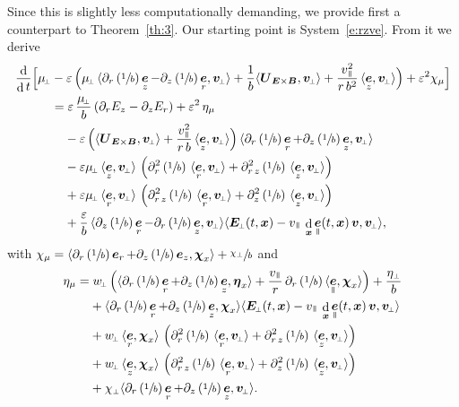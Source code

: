 \documentclass[10pt]{amsart}
\newcommand{\sperp}{{\scriptscriptstyle\perp}}
\let\eps\varepsilon
\let\d\partial
\DeclareMathOperator\dD{d}\let\dd\dD
\theoremstyle{plain}
\theoremstyle{definition}
\newcommand\bB{{\boldsymbol B}}
\newcommand\bE{{\boldsymbol E}}
\newcommand\bU{{\boldsymbol U}}
\newcommand\bfv{{\boldsymbol v}}
\newcommand\bfx{{\boldsymbol x}}
\newcommand\bfeta{{\boldsymbol \eta}}
\newcommand\bfchi{{\boldsymbol \chi}}
\DeclareMathOperator{\beD}{\boldsymbol{e}}
\newcommand\eDr{\beD_r}
\newcommand\eDz{\beD_z}
\newcommand\eDpar{\beD_\mypar}
\newcommand\vpar{v_\mypar}
\newcommand\bvperp{\bfv_{\!\sperp}}
\newcommand\eperp{w_{\!\sperp}}
\newcommand\muperp{\mu_{\!\sperp}}
\newcommand\Eperp{\bE_{\!\sperp}}
\newcommand\Er{E_r}
\newcommand\Ez{E_z}
\newcommand{\EcB}{\bU_{\bE\times\bB}}
\newcommand{\mypar}{{\mkern3mu\vphantom{\perp}\vrule depth 0pt\mkern2mu\vrule depth 0pt\mkern3mu}}
\begin{document}
Since this is slightly less computationally demanding, we provide first a counterpart to Theorem~\ref{th:3}. Our starting point is System~\eqref{e:rzve}. From it we derive
\begin{align*}
\frac{\dD}{\dD t}\Bigl[\muperp&
-\eps\,\Bigl(
\muperp\,\langle
\d_r\left(\sfrac1b\right)\eDz-\d_z\left(\sfrac1b\right)\eDr,\bvperp\rangle +\frac1b\langle\EcB,\bvperp\rangle
+\frac{\vpar^2}{r\,b^2}
\,\langle\eDz,\bvperp\rangle
\Bigr)+\eps^2\chi_\mu\Bigr]\\
&=
\eps\,\frac{\muperp}{b}\left(\d_r\Ez-\d_z\Er\right)
+\eps^2\,\eta_\mu\\
&\hphantom{={}}-\eps\,
\Bigl(\langle\EcB,\bvperp\rangle
+\frac{\vpar^2}{r\,b}
\,\langle\eDz,\bvperp\rangle
\Bigr)
\,\langle
\d_r\left(\sfrac1b\right)\eDr
+\d_z\left(\sfrac1b\right)\eDz
,\bvperp\rangle\\
&\hphantom{={}}
-\eps\muperp\,\langle\eDz,\bvperp\rangle\,\left(
\d_r^2\left(\sfrac1b\right)\,\langle\eDr,\bvperp\rangle
+\d_{r\,z}^2\left(\sfrac1b\right)\,\langle\eDz,\bvperp\rangle
\right)
\\
&\hphantom{={}}
+\eps\muperp\,\langle\eDr,\bvperp\rangle\,
\left(\d_{r\,z}^2\left(\sfrac1b\right)\,\langle\eDr,\bvperp\rangle
+\d_z^2\left(\sfrac1b\right)\,\langle\eDz,\bvperp\rangle
\right)
\\
&\hphantom{={}}
+\frac{\eps}{b}\,
\langle\d_z\left(\sfrac1b\right)\eDr
-\d_r\left(\sfrac1b\right)\eDz,
\bvperp\rangle\langle \Eperp(t,\bfx)-\vpar\,
\dD_{\bfx}\eDpar(t,\bfx)\,\bfv,
\bvperp\rangle,
\end{align*}
with
$\chi_\mu
=
\langle\d_r\left(\sfrac1b\right)\eDr
+\d_z\left(\sfrac1b\right)\eDz,\bfchi_x\rangle
+\sfrac{\chi_\sperp}{b}$
and
\begin{align*}
\eta_\mu&=
\eperp\,\Bigl(\langle\d_r\left(\sfrac1b\right)\eDr+\d_z\left(\sfrac1b\right)\eDz,\bfeta_x\rangle+\frac{\vpar}{r}\,\d_r\left(\sfrac1b\right)\langle\eDpar,\bfchi_x\rangle\Bigr)
+\frac{\eta_\sperp}{b}\\
&\hphantom{={}}
+\langle
\d_r\left(\sfrac1b\right)\eDr
+\d_z\left(\sfrac1b\right)\eDz,\bfchi_x\rangle
\langle \Eperp(t,\bfx)-\vpar\,
\dD_{\bfx}\eDpar(t,\bfx)\,\bfv,
\bvperp\rangle
\\
&\hphantom{={}}
+\eperp\,\langle\eDr,\bfchi_x\rangle\,\left(
\d_r^2\left(\sfrac1b\right)\,\langle\eDr,\bvperp\rangle
+\d_{r\,z}^2\left(\sfrac1b\right)\,\langle\eDz,\bvperp\rangle
\right)
\\
&\hphantom{={}}
+\eperp\,\langle\eDz,\bfchi_x\rangle\,\left(
\d_{r\,z}^2\left(\sfrac1b\right)\,\langle\eDr,\bvperp\rangle
+\d_z^2\left(\sfrac1b\right)\,\langle\eDz,\bvperp\rangle
\right)
\\
&\hphantom{={}}
+\chi_\sperp\langle
\d_r\left(\sfrac1b\right)\eDr
+\d_z\left(\sfrac1b\right)\eDz
,\bvperp\rangle.
\end{align*}
\end{document}
